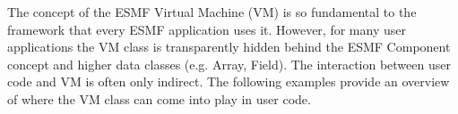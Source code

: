 
The concept of the ESMF Virtual Machine (VM) is so fundamental to the framework that every ESMF application uses it. However, for many user applications the VM class is transparently hidden behind the ESMF Component concept and higher data classes (e.g. Array, Field). The interaction between user code and VM is often only indirect. The following examples provide an overview of where the VM class can come into play in user code.
